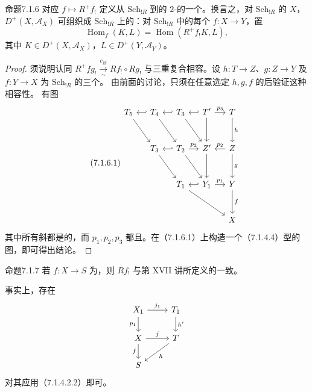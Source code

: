 \begin{SGAresult}{命题}{7.1.6}
对应 $f\mapsto R^+f_!$ 定义从 $\mathrm{Sch}_{!R}$ 到的 $2$-的一个。换言之，对 $\mathrm{Sch}_{!R}$ 的 $X$， $D^+(X,\mathscr A_X)$ 可组织成 $\mathrm{Sch}_{!R}$ 上的：对 $\mathrm{Sch}_{!R}$ 中的每个 $f:X\to Y$，置
\[\operatorname{Hom}_f(K,L)=\operatorname{Hom}(R^+f_!K,L),\]
其中 $K\in D^+(X,\mathscr A_X)$，$L\in D^+(Y,\mathscr A_Y)$。
\end{SGAresult}
\begin{proof}
须说明认同 $R^+fg_!\xrightarrow[\sim]{c_{fg}}Rf_!\circ Rg_!$ 与三重复合相容。设 $h:T\to Z$、$g:Z\to Y$ 及 $f:Y\to X$ 为 $\mathrm{Sch}_{!R}$ 的三个。
由前面的讨论，只须在任意选定 $h,g,f$ 的后验证这种相容性。
有图
\begin{equation}\tag{7.1.6.1}
\begin{tikzcd}[column sep=small,row sep=large]
T_5\arrow[dr]&T_4\arrow[l,hook']\arrow[dr]&T_3\arrow[l,hook']\arrow[dr]&T'\arrow[l,hook']\arrow[d]\arrow[r,"p_3"]&T\arrow[d,"h"]\\
&T_3\arrow[dr]&T_2\arrow[l,hook']\arrow[dr]\arrow[r,"p_2"]&Z'\arrow[d]&Z\arrow[l,"p_2"']\arrow[d,"g"]\\
&&T_1\arrow[drr]&Y_1\arrow[l,hook']\arrow[r,"p_1"]&Y\arrow[d,"f"]\\
&&&&X
\end{tikzcd}
\end{equation}
其中所有斜都是的，而 $p_1,p_2,p_3$ 都且。在（7.1.6.1）上构造一个（7.1.4.4）型的图，即可得出结论。
\end{proof}

\begin{SGAresult}{命题}{7.1.7}
若 $f:X\to S$ 为，则 $Rf_!$ 与第 XVII 讲所定义的一致。
\end{SGAresult}
事实上，存在
\[
\begin{tikzcd}
X_1\arrow[r,"j_1"]\arrow[d,"p_1"']&T_1\arrow[d,"h'"]\\
X\arrow[r,"j"]\arrow[d,"f"']&T\arrow[dl,"h"]\\
S&
\end{tikzcd}
\]
对其应用（7.1.4.2.2）即可。

